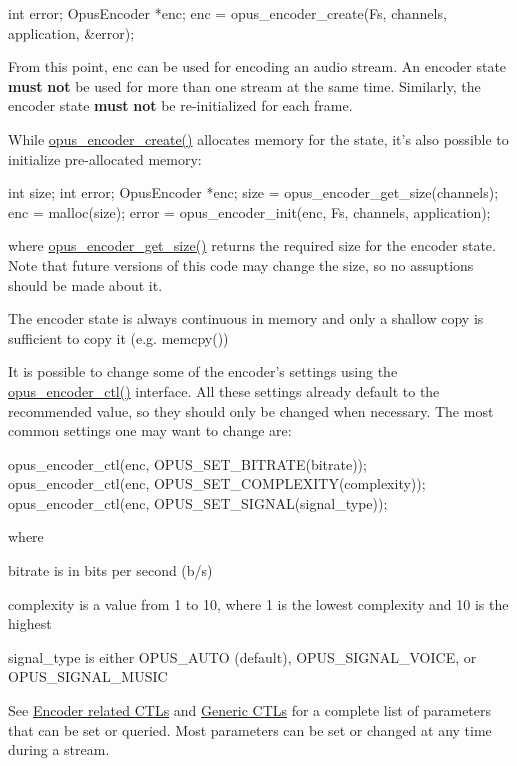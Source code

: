 \begin{DoxyCode}
 int          error;
 OpusEncoder *enc;
 enc = opus_encoder_create(Fs, channels, application, &error);
\end{DoxyCode}


From this point, {\ttfamily enc} can be used for encoding an audio stream. An encoder state {\bfseries must} {\bfseries not} be used for more than one stream at the same time. Similarly, the encoder state {\bfseries must} {\bfseries not} be re-\/initialized for each frame.

While \hyperlink{group__opus__encoder_gaa89264fd93c9da70362a0c9b96b9ca88}{opus\_\-encoder\_\-create()} allocates memory for the state, it's also possible to initialize pre-\/allocated memory:


\begin{DoxyCode}
 int          size;
 int          error;
 OpusEncoder *enc;
 size = opus_encoder_get_size(channels);
 enc = malloc(size);
 error = opus_encoder_init(enc, Fs, channels, application);
\end{DoxyCode}


where \hyperlink{group__opus__encoder_gaefeb7dc1d6e3b59dea5ea674c86e9c18}{opus\_\-encoder\_\-get\_\-size()} returns the required size for the encoder state. Note that future versions of this code may change the size, so no assuptions should be made about it.

The encoder state is always continuous in memory and only a shallow copy is sufficient to copy it (e.g. memcpy())

It is possible to change some of the encoder's settings using the \hyperlink{group__opus__encoder_ga164cbb0425238961919adf1db67949df}{opus\_\-encoder\_\-ctl()} interface. All these settings already default to the recommended value, so they should only be changed when necessary. The most common settings one may want to change are:


\begin{DoxyCode}
 opus_encoder_ctl(enc, OPUS_SET_BITRATE(bitrate));
 opus_encoder_ctl(enc, OPUS_SET_COMPLEXITY(complexity));
 opus_encoder_ctl(enc, OPUS_SET_SIGNAL(signal_type));
\end{DoxyCode}


where

\begin{DoxyItemize}
\item bitrate is in bits per second (b/s) \item complexity is a value from 1 to 10, where 1 is the lowest complexity and 10 is the highest \item signal\_\-type is either OPUS\_\-AUTO (default), OPUS\_\-SIGNAL\_\-VOICE, or OPUS\_\-SIGNAL\_\-MUSIC\end{DoxyItemize}
See \hyperlink{group__opus__encoderctls}{Encoder related CTLs} and \hyperlink{group__opus__genericctls}{Generic CTLs} for a complete list of parameters that can be set or queried. Most parameters can be set or changed at any time during a stream.

